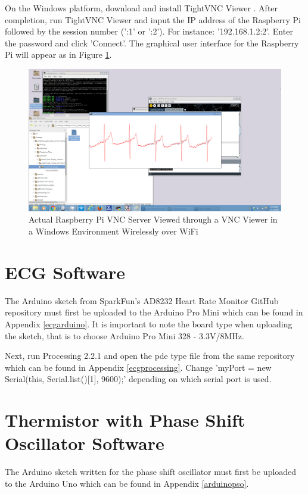 On the Windows platform, download and install TightVNC Viewer \cite{windowstightvnc}. After completion, run TightVNC Viewer and input the IP address of the Raspberry Pi followed by the session number (':1' or ':2'). For instance: '192.168.1.2:2'. Enter the password and click 'Connect'. The graphical user interface for the Raspberry Pi will appear as in Figure \ref{vncserver}. 

\begin{figure}[H]
	\centering
	\includegraphics[width=\linewidth]{vncserver.png}
	\caption{Actual Raspberry Pi VNC Server Viewed through a VNC Viewer in a Windows Environment Wirelessly over WiFi}
	\label{vncserver}
\end{figure} 

\section{ECG Software}

The Arduino sketch from SparkFun's AD8232 Heart Rate Monitor GitHub repository must first be uploaded to the Arduino Pro Mini \cite{ad8232github} which can be found in Appendix \ref{ecgarduino}. It is important to note the board type when uploading the sketch, that is to choose Arduino Pro Mini 328 - 3.3V/8MHz. 

Next, run Processing 2.2.1 and open the pde type file from the same repository \cite{ad8232github} which can be found in Appendix \ref{ecgprocessing}. Change 'myPort = new Serial(this, Serial.list()[1], 9600);' depending on which serial port is used. 

\section{Thermistor with Phase Shift Oscillator Software}

The Arduino sketch written for the phase shift oscillator must first be uploaded to the Arduino Uno which can be found in Appendix \ref{arduinopso}.

